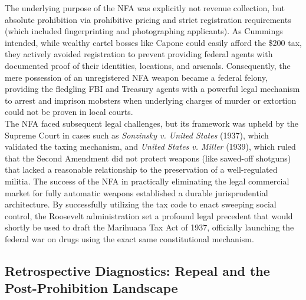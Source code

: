 \documentclass[
]{article}
\begin{document}
The underlying purpose of the NFA was explicitly not revenue collection,
but absolute prohibition via prohibitive pricing and strict registration
requirements (which included fingerprinting and photographing
applicants). As Cummings intended, while wealthy cartel bosses like
Capone could easily afford the \$200 tax, they actively avoided
registration to prevent providing federal agents with documented proof
of their identities, locations, and arsenals. Consequently, the mere
possession of an unregistered NFA weapon became a federal felony,
providing the fledgling FBI and Treasury agents with a powerful legal
mechanism to arrest and imprison mobsters when underlying charges of
murder or extortion could not be proven in local courts.\\
The NFA faced subsequent legal challenges, but its framework was upheld
by the Supreme Court in cases such as \emph{Sonzinsky v. United States}
(1937), which validated the taxing mechanism, and \emph{United States v.
Miller} (1939), which ruled that the Second Amendment did not protect
weapons (like sawed-off shotguns) that lacked a reasonable relationship
to the preservation of a well-regulated militia. The success of the NFA
in practically eliminating the legal commercial market for fully
automatic weapons established a durable jurisprudential architecture. By
successfully utilizing the tax code to enact sweeping social control,
the Roosevelt administration set a profound legal precedent that would
shortly be used to draft the Marihuana Tax Act of 1937, officially
launching the federal war on drugs using the exact same constitutional
mechanism.

\subsection{\texorpdfstring{\textbf{Retrospective Diagnostics: Repeal
and the Post-Prohibition
Landscape}}{Retrospective Diagnostics: Repeal and the Post-Prohibition Landscape}}\label{retrospective-diagnostics-repeal-and-the-post-prohibition-landscape}
\end{document}
